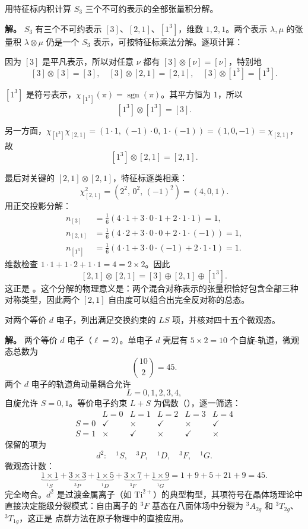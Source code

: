 \begin{example}
\label{ex:s3-cg-table}
用特征标内积计算 $S_3$ 三个不可约表示的全部张量积分解。

\textbf{解。} $S_3$ 有三个不可约表示 $[3]$、$[2,1]$、$[1^3]$，维数 $1,2,1$。两个表示 $\lambda,\mu$ 的张量积 $\lambda\otimes\mu$ 仍是一个 $S_3$ 表示，可按特征标乘法分解。逐项计算：

因为 $[3]$ 是平凡表示，所以对任意 $\nu$ 都有 $[3]\otimes[\nu]=[\nu]$，特别地
\[
[3]\otimes[3]=[3],\quad[3]\otimes[2,1]=[2,1],\quad[3]\otimes[1^3]=[1^3].
\]

$[1^3]$ 是符号表示，$\chi_{[1^3]}(\pi)=\operatorname{sgn}(\pi)$。其平方恒为 $1$，所以
\[
[1^3]\otimes[1^3]=[3].
\]

另一方面，$\chi_{[1^3]}\chi_{[2,1]}=(1\cdot1,\,(-1)\cdot0,\,1\cdot(-1))=(1,0,-1)=\chi_{[2,1]}$，故
\[
[1^3]\otimes[2,1]=[2,1].
\]

最后对关键的 $[2,1]\otimes[2,1]$，特征标逐类相乘：
\[
\chi_{[2,1]}^2=(2^2,\,0^2,\,(-1)^2)=(4,0,1).
\]
用正交投影分解：
\begin{align*}
n_{[3]}&=\frac16(4\cdot1+3\cdot0\cdot1+2\cdot1\cdot1)=1,\\
n_{[2,1]}&=\frac16(4\cdot2+3\cdot0\cdot0+2\cdot1\cdot(-1))=1,\\
n_{[1^3]}&=\frac16(4\cdot1+3\cdot0\cdot(-1)+2\cdot1\cdot1)=1.
\end{align*}
维数检查 $1\cdot1+1\cdot2+1\cdot1=4=2\times2$。因此
\[
[2,1]\otimes[2,1]=[3]\oplus[2,1]\oplus[1^3].
\]
这正是 。这个分解的物理意义是：两个混合对称表示的张量积恰好包含全部三种对称类型，因此两个 $[2,1]$ 自由度可以组合出完全反对称的总态。
\end{example}

\begin{example}[{$d^2$ 构型：$L+S$ 偶数规则的完整列表}]
对两个等价 $d$ 电子，列出满足交换约束的 $LS$ 项，并核对四十五个微观态。

\textbf{解。} 两个等价 $d$ 电子（$\ell=2$）。单电子 $d$ 壳层有 $5\times2=10$ 个自旋-轨道，微观态总数为
\[
\binom{10}{2}=45.
\]
两个 $d$ 电子的轨道角动量耦合允许
\[
L=0,1,2,3,4,
\]
自旋允许 $S=0,1$。等价电子约束 $L+S$ 为偶数（），逐一筛选：
\[
\begin{array}{c|ccccc}
& L=0&L=1&L=2&L=3&L=4\\\hline
S=0&\checkmark&\times&\checkmark&\times&\checkmark\\
S=1&\times&\checkmark&\times&\checkmark&\times
\end{array}
\]
保留的项为
\[
d^2:\quad{}^1S,\quad{}^3P,\quad{}^1D,\quad{}^3F,\quad{}^1G.
\]
微观态计数：
\[
\underbrace{1\times1}_{^1S}+\underbrace{3\times3}_{^3P}+\underbrace{1\times5}_{^1D}+\underbrace{3\times7}_{^3F}+\underbrace{1\times9}_{^1G}=1+9+5+21+9=45.
\]
完全吻合。$d^2$ 是过渡金属离子（如 $\text{Ti}^{2+}$）的典型构型，其项符号在晶体场理论中直接决定能级分裂模式：自由离子的 $^3F$ 基态在八面体场中分裂为 $^3A_{2g}$ 和 $^3T_{2g}$、$^3T_{1g}$，这正是  点群方法在原子物理中的直接应用。
\end{example}

